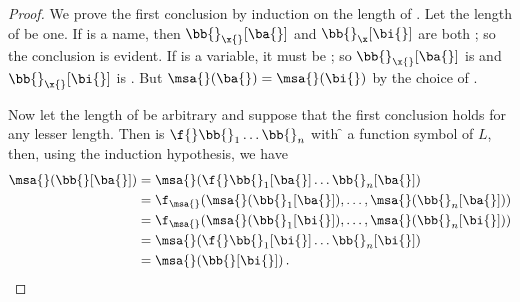 \begin{proof}
    We prove the first conclusion by induction on the length of \bb{}.
    Let the length of \bb{} be one.
    If \bb{} is a name, then $\bb{}_\x{} [\ba{}]$ and $\bb{}_\x [\bi{}]$ are both \bb{};
    so the conclusion is evident.
    If \bb{} is a variable, it must be \x{};
    so $\bb{}_\x{} [\ba{}]$ is \ba{} and $\bb{}_\x{} [\bi{}]$ is \bi{}.
    But $\msa{}(\ba{}) = \msa{}(\bi{})$ by the choice of \bi{}.
    
    Now let the length of \bb{} be arbitrary and suppose that the first conclusion holds for any lesser length.
    Then \bb{} is $\f{} \bb{}_1 \dots \bb{}_n$ with \f{} a function symbol of $L$, then, using the induction hypothesis, we have
    \begin{align}
        \msa{}(\bb{}[\ba{}]) &=
            \msa{}(\f{}\bb{}_1[\ba{}] \dots \bb{}_n[\ba{}]) \\
            &= \f_\msa{} (\msa{} (\bb{}_1 [\ba{}]), \dots, \msa{} (\bb{}_n [\ba{}])) \\
            &= \f_\msa{} (\msa{} (\bb{}_1 [\bi{}]), \dots, \msa{} (\bb{}_n [\bi{}])) \\
            &= \msa{}(\f{}\bb{}_1[\bi{}] \dots \bb{}_n[\bi{}]) \\
            &= \msa{} (\bb{}[\bi{}])\,.
    \end{align}
    

\end{proof}
